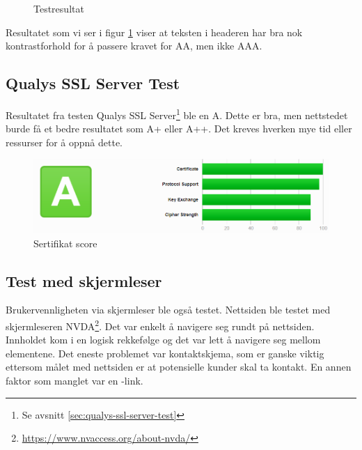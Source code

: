 \begin{figure}[H]
    \begin{center}

        \caption{Testresultat}
        \label{fig:analysis-current-a11y_bg-h1_p}
    \end{center}
\end{figure}

Resultatet som vi ser i figur \ref{fig:analysis-current-a11y_bg-h1_p} viser at teksten i headeren har bra nok kontrastforhold for å passere kravet for AA, men ikke AAA. 

\subsection{Qualys SSL Server Test}
Resultatet fra testen Qualys SSL Server\footnote{Se avsnitt \ref{sec:qualys-ssl-server-test}} ble en A. Dette er bra, men nettstedet burde få et bedre resultatet som A+ eller A++. Det kreves hverken mye tid eller ressurser for å oppnå dette.

\begin{figure}[H]
    \centering
    \includegraphics[width=\textwidth]{bjornar/ssllabs.png}
    \caption{Sertifikat score}
    \label{fig:analysis-current-ssl}
\end{figure}

\subsection{Test med skjermleser}
Brukervennligheten via skjermleser ble også testet. Nettsiden ble testet med skjermleseren NVDA\footnote{\url{https://www.nvaccess.org/about-nvda/}}. Det var enkelt å navigere seg rundt på nettsiden. Innholdet kom i en logisk rekkefølge og det var lett å navigere seg mellom elementene. Det eneste problemet var kontaktskjema, som er ganske viktig ettersom målet med nettsiden er at potensielle kunder skal ta kontakt. En annen faktor som manglet var en -link.

